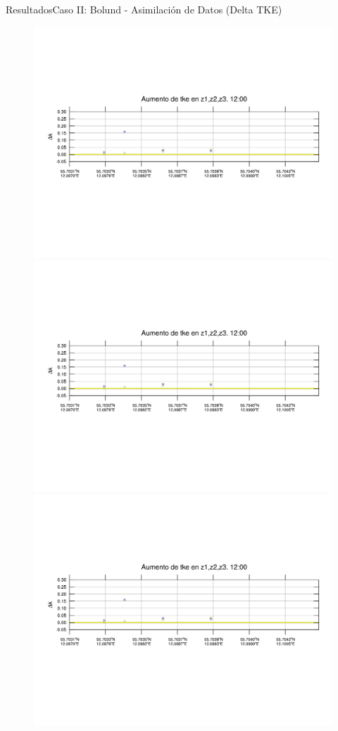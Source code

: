 \documentclass[mathserif,10pt]{beamer}
\begin{document}
\begin{frame}{Resultados}{Caso II: Bolund - Asimilación de Datos (Delta TKE)}
	\begin{figure}[H]
		\centering
		\includegraphics[width=0.65\linewidth,trim={12mm 84mm 10mm 74mm},page=1,clip]{fig/06/bol_da/delta_tke}\\%
		\includegraphics[width=0.65\linewidth,trim={12mm 84mm 10mm 74mm},page=13,clip]{fig/06/bol_da/delta_tke}\\%
		\includegraphics[width=0.65\linewidth,trim={12mm 84mm 10mm 74mm},page=25,clip]{fig/06/bol_da/delta_tke}\\%

\end{figure}
\end{frame}
\end{document}

